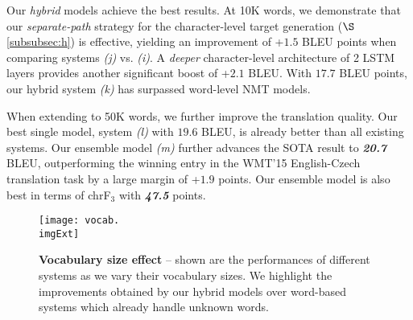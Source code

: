 \documentclass[11pt]{article}
\newcommand{\imgExt}{eps}
\newcommand{\bi}[1]{\textbf{\textit{#1}}}
\newcommand{\unk}{$<${\it unk}$>$}
\newcommand{\modelsmall}{{\it (k)}}
\newcommand{\model}{{\it (l)}}
\newcommand{\ensbleu}{20.7}
\newcommand{\chr}{chrF$_3$}
\begin{document}


Our {\it hybrid} models achieve the best results. 
At 10K words, we demonstrate that our {\it
separate-path} strategy for the character-level target generation
($\S$\ref{subsubsec:h}) is effective, yielding an improvement of +$1.5$ BLEU
points when comparing systems {\it (j)} vs. {\it (i)}. A {\it deeper} character-level architecture of 2 LSTM
layers provides another significant
boost of +$2.1$ BLEU. %
With $17.7$ BLEU points, our hybrid system \modelsmall{} has
surpassed word-level NMT models.

When extending to 50K words, we further improve the translation quality.
Our best single model, system \model{} with $19.6$ BLEU, is already better than all
existing systems.
Our ensemble model {\it (m)} further advances the SOTA
result to \bi{\ensbleu} BLEU, outperforming
the winning entry in the WMT'15 English-Czech translation task by a large margin
of +$1.9$ points. Our ensemble model is also best in terms of \chr{} with \bi{47.5} points.

\begin{figure}%
\centering
\texttt{[image: vocab.\\imgExt]}
\caption{{\bf Vocabulary size effect} -- shown are the performances of different
systems as we vary their vocabulary sizes. We highlight the improvements obtained
by our hybrid models over word-based systems which already handle unknown words.}
\label{f:vocab}
\end{figure}
\end{document}
